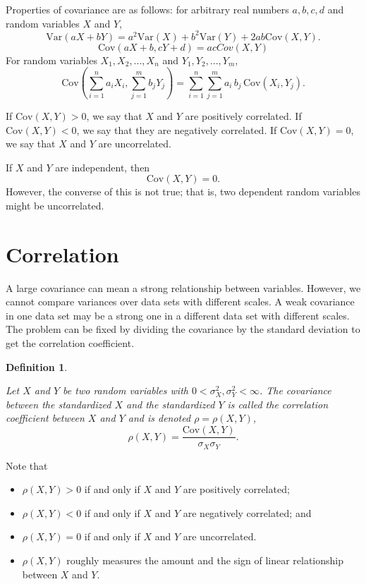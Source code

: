 \documentclass[
]{book}
\theoremstyle{definition}
\newtheorem{definition}{Definition}[chapter]
\theoremstyle{definition}
\theoremstyle{definition}
\theoremstyle{definition}
\theoremstyle{remark}
\begin{document}
Properties of covariance are as follows: for arbitrary real numbers
\(a, b, c, d\) and random variables \(X\) and \(Y\),
\[\mathrm{Var}(aX + bY) = a^2 \mathrm{Var}(X) + b^2 \mathrm{Var}(Y) + 2 a b \mathrm{Cov}(X,Y).\]
\[\mathrm{Cov}(aX + b, cY + d) = acCov(X, Y)\] For random variables
\(X_1, X_2, . . . , X_n\) and \(Y_1, Y_2, . . . , Y_m\),
\[\mathrm{Cov}(\sum_{i=1}^n a_i X_i, \sum_{j=1}^m b_j Y_j) = \sum_{i=1}^n\sum_{j=1}^m a_i\,b_j\, \mathrm{Cov}(X_i,Y_j).\]

If \(\mathrm{Cov}(X, Y) > 0\), we say that \(X\) and \(Y\) are positively
correlated. If \(\mathrm{Cov}(X, Y) < 0\), we say that they are negatively
correlated. If \(\mathrm{Cov}(X, Y) = 0\), we say that \(X\) and \(Y\) are
uncorrelated.

If \(X\) and \(Y\) are independent, then \[\mathrm{Cov}(X,Y) = 0.\] However,
the converse of this is not true; that is, two dependent random
variables might be uncorrelated.

\hypertarget{correlation}{%
\section{Correlation}\label{correlation}}

A large covariance can mean a strong relationship between variables.
However, we cannot compare variances over data sets with different
scales. A weak covariance in one data set may be a strong one in a
different data set with different scales. The problem can be fixed by
dividing the covariance by the standard deviation to get the correlation
coefficient.

\begin{definition}
\protect\hypertarget{def:unlabeled-div-27}{}\label{def:unlabeled-div-27}

\emph{Let \(X\) and \(Y\) be two random variables with
\(0< \sigma^2_X, \sigma^2_Y < \infty\). The covariance between the
standardized \(X\) and the standardized \(Y\) is called the correlation
coefficient between \(X\) and \(Y\) and is denoted \(\rho = \rho(X,Y)\),
\[\rho(X,Y) = \frac{\mathrm{Cov}(X,Y)}{\sigma_X \sigma_Y}.\] }

\end{definition}

Note that

\begin{itemize}
\item
  \(\rho(X, Y ) > 0\) if and only if \(X\) and \(Y\) are positively
  correlated;
\item
  \(\rho(X, Y ) < 0\) if and only if \(X\) and \(Y\) are negatively
  correlated; and
\item
  \(\rho(X, Y ) = 0\) if and only if \(X\) and \(Y\) are uncorrelated.
\item
  \(\rho(X, Y )\) roughly measures the amount and the sign of linear
  relationship between \(X\) and \(Y\).
\end{itemize}
\end{document}
